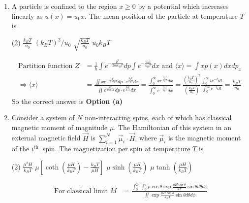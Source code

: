 \begin{enumerate}
	\item A particle is confined to the region $x \geq 0$ by a potential which increases linearly as $u(x)=u_{0} x$. The mean position of the particle at temperature $T$ is
	 \begin{tasks}(2)
		\task[\textbf{a.}] $\frac{k_{B} T}{u_{0}}$
		\task[\textbf{b.}]$\left(k_{B} T\right)^{2} / u_{0}$
		\task[\textbf{c.}]$\sqrt{\frac{k_{B} T}{u_{0}}}$
		\task[\textbf{d.}]  $u_{0} k_{B} T$
	\end{tasks}
\begin{answer}
	\begin{align*}
	\text{Partition function }Z&=\frac{1}{h} \int e^{-\frac{p^{2}}{2 m k_{B} T}} d p \int e^{-\frac{u_{0} x}{k_{B} T}} d x\text{ and }\langle x\rangle=\int x p(x) d x d p_{x}\\
	\Rightarrow\langle x\rangle&=\frac{\iint x e^{-\frac{p^{2}}{2 m k_{B} T}} d p \cdot e^{\frac{u_{0} x}{k_{B} T}} d x}{\iint e^{\frac{p^{2}}{2 m k_{B} T}} d p \cdot e^{\frac{u_{0} x}{k_{B} T}} d x}=\frac{\int_{0}^{\infty} x e^{\frac{\mu_{0} x}{k_{B} T}} d x}{\int_{0}^{\infty} e^{-\frac{\mu_{0} x}{k_{B} T}} d x}=\frac{\left(\frac{k_{B} T}{u_{0}}\right)^{2}}{\left(\frac{k_{B} T}{u_{0}}\right)} \frac{\int_{0}^{\infty} t e^{-t} d t}{\int_{0}^{\infty} e^{-t} d t}=\frac{k_{B} T}{u_{0}}
	\end{align*}
	So the correct answer is \textbf{Option (a)}
\end{answer}
\item 	Consider a system of $N$ non-interacting spins, each of which has classical magnetic moment of magnitude $\mu$. The Hamiltonian of this system in an external magnetic field $\vec{H}$ is $\sum_{i=1}^{N} \vec{\mu}_{i} \cdot \vec{H}$, where $\vec{\mu}_{i}$ is the magnetic moment of the $i^{\text {th }}$ spin. The magnetization per spin at temperature $T$ is
	 \begin{tasks}(2)
		\task[\textbf{a.}]$\frac{\mu^{2} H}{k_{B} T}$
		\task[\textbf{b.}]$\mu\left[\operatorname{coth}\left(\frac{\mu H}{k_{B} T}\right)-\frac{k_{B} T}{\mu H}\right]$
		\task[\textbf{c.}] $\mu \sinh \left(\frac{\mu H}{k_{B} T}\right)$
		\task[\textbf{d.}] $\mu \tanh \left(\frac{\mu H}{k_{B} T}\right)$
	\end{tasks}
\begin{answer}
	\begin{align*}
	\text { For classical limit } M&=\frac{\int_{0}^{2 \pi} \int_{0}^{\pi} \mu \cos \theta \exp \frac{\mu H \cos \theta}{k T} \sin \theta d \theta d \phi}{\iint \exp \frac{\mu H \cos \theta}{k_{B} T} \sin \theta d \theta d \phi} \\

\end{align*}
\end{answer}
\end{enumerate}
